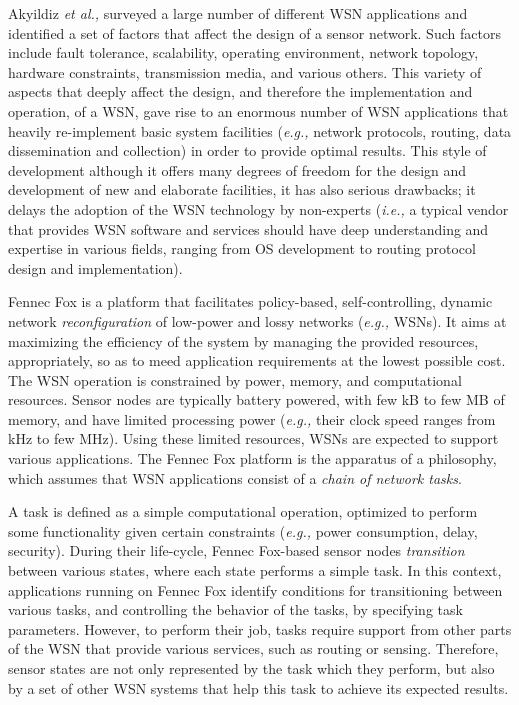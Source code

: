 Akyildiz \textit{et al.,} \cite{wsn_survey} surveyed a large number of
different WSN applications and identified a set of factors that affect 
the design of a sensor network. Such factors include fault tolerance,
scalability, operating environment, network topology, hardware
constraints, transmission media, and various others. This variety of
aspects that deeply affect the design, and therefore the implementation
and operation, of a WSN, gave rise to an enormous number of WSN
applications that heavily re-implement basic system facilities
(\textit{e.g.,} network protocols, routing, data dissemination and
collection) in order to provide optimal results. This style of development
although it offers many degrees of freedom for the design and development 
of new and elaborate facilities, it has also serious drawbacks; it delays 
the adoption of the WSN technology by non-experts (\textit{i.e.,} a
typical vendor that provides WSN software and services should have deep
understanding and expertise in various fields, ranging from OS development
to routing protocol design and implementation). 

Fennec Fox is a platform that facilitates policy-based, self-controlling,
dynamic network \textit{reconfiguration} of low-power and lossy networks
(\textit{e.g.,} WSNs). It aims at maximizing the efficiency of the system
by managing the provided resources, appropriately, so as to meed
application requirements at the lowest possible cost. The WSN operation
is constrained by power, memory, and computational resources. Sensor nodes
are typically battery powered, with few kB to few MB of memory, and have
limited processing power (\textit{e.g.,} their clock speed ranges from kHz
to few MHz). Using these limited resources, WSNs are expected to support
various applications. The Fennec Fox platform is the apparatus of a
philosophy, which assumes that WSN applications consist of a \textit{chain
of network tasks}.

A task is defined as a simple computational operation, optimized to
perform some functionality given certain constraints (\textit{e.g.,} power
consumption, delay, security). During their life-cycle, Fennec Fox-based
sensor nodes \textit{transition} between various states, where each state
performs a simple task. In this context, applications running on Fennec
Fox identify conditions for transitioning between various tasks, and
controlling the behavior of the tasks, by specifying task parameters.
However, to perform their job, tasks require support from other parts of
the WSN that provide various services, such as routing or sensing.
Therefore, sensor states are not only represented by the task which they
perform, but also by a set of other WSN systems that help this task to
achieve its expected results. 

